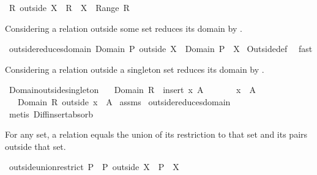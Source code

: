 \begin{isabellebody}
\ {\isachardoublequoteopen}R\ outside\ X\ {\isacharequal}\ R\ {\isacharminus}\ {\isacharparenleft}X\ {\isasymtimes}\ Range\ R{\isacharparenright}{\isachardoublequoteclose}%
\begin{isamarkuptext}%
Considering a relation outside some set  reduces its domain by .%
\end{isamarkuptext}%
\isamarkuptrue%
\isamarkupfalse%
\ outside{\isacharunderscore}reduces{\isacharunderscore}domain{\isacharcolon}\ {\isachardoublequoteopen}Domain\ {\isacharparenleft}P\ outside\ X{\isacharparenright}\ {\isacharequal}\ Domain\ P\ {\isacharminus}\ X{\isachardoublequoteclose}\isanewline
%
\isadelimproof
%
\endisadelimproof
%
\isatagproof
{}\isamarkupfalse%
\ Outside{\isacharunderscore}def\ \isamarkupfalse%
\ fast%
\endisatagproof
{\isafoldproof}%
%
\isadelimproof
%
\endisadelimproof
%
\begin{isamarkuptext}%
Considering a relation outside a singleton set  reduces its domain by 
  .%
\end{isamarkuptext}%
\isamarkuptrue%
\isamarkupfalse%
\ Domain{\isacharunderscore}outside{\isacharunderscore}singleton{\isacharcolon}\isanewline
\ \ \ {\isachardoublequoteopen}Domain\ R\ {\isacharequal}\ insert\ x\ A{\isachardoublequoteclose}\isanewline
\ \ \ \ \ \ \ {\isachardoublequoteopen}x\ {\isasymnotin}\ A{\isachardoublequoteclose}\isanewline
\ \ \ {\isachardoublequoteopen}Domain\ {\isacharparenleft}R\ outside\ {\isacharbraceleft}x{\isacharbraceright}{\isacharparenright}\ {\isacharequal}\ A{\isachardoublequoteclose}\isanewline
%
\isadelimproof
%
\endisadelimproof
%
\isatagproof
{}\isamarkupfalse%
\ assms\isanewline
{}\isamarkupfalse%
\ outside{\isacharunderscore}reduces{\isacharunderscore}domain\isanewline
{}\isamarkupfalse%
\ {\isacharparenleft}metis\ Diff{\isacharunderscore}insert{\isacharunderscore}absorb{\isacharparenright}%
\endisatagproof
{\isafoldproof}%
%
\isadelimproof
%
\endisadelimproof
%
\begin{isamarkuptext}%
For any set, a relation equals the union of its restriction to that set and its
  pairs outside that set.%
\end{isamarkuptext}%
\isamarkuptrue%
\isamarkupfalse%
\ outside{\isacharunderscore}union{\isacharunderscore}restrict{\isacharcolon}\ {\isachardoublequoteopen}P\ {\isacharequal}\ P\ outside\ X\ {\isasymunion}\ P\ {\isacharbar}{\isacharbar}\ X{\isachardoublequoteclose}\isanewline

\end{isabellebody}
